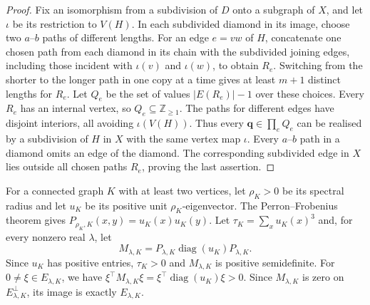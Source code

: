 \documentclass[10pt,a4paper]{article}
\theoremstyle{plain}
\theoremstyle{definition}
\DeclareMathOperator{\diag}{diag}
\newcommand{\Z}{\mathbb{Z}}
\begin{document}
\begin{proof}
Fix an isomorphism from a subdivision of $D$ onto a subgraph of $X$,
and let $\iota$ be its restriction to $V(H)$.
In each subdivided diamond in its image, choose two $a$--$b$ paths of
different lengths. For an edge $e=vw$ of $H$, concatenate one chosen
path from each diamond in its chain with the subdivided joining edges,
including those incident with $\iota(v)$ and $\iota(w)$, to obtain $R_e$.
Switching from the shorter to the longer path in one copy at a time
gives at least $m+1$ distinct lengths for $R_e$.
Let $Q_e$ be the set of values $|E(R_e)|-1$ over these choices.
Every $R_e$ has an internal vertex, so $Q_e\subseteq\Z_{\geq1}$.
The paths for different edges have disjoint interiors, all avoiding
$\iota(V(H))$. Thus every $\mathbf q\in\prod_eQ_e$ can be realised by
a subdivision of $H$ in $X$ with the same vertex map $\iota$.
Every $a$--$b$ path in a diamond omits an edge of the diamond.
The corresponding subdivided edge in $X$ lies outside all chosen
paths $R_e$, proving the last assertion.
\end{proof}

For a connected graph $K$ with at least two vertices, let $\rho_K>0$ be its spectral
radius and let $u_K$ be its positive unit $\rho_K$-eigenvector.
The Perron--Frobenius theorem gives
$P_{\rho_K,K}(x,y)=u_K(x)u_K(y)$.
Let $\tau_K=\sum_xu_K(x)^3$ and, for every nonzero real $\lambda$, let
\begin{equation}\label{eq:perron-data}
 M_{\lambda,K}=P_{\lambda,K}\diag(u_K)P_{\lambda,K}.
\end{equation}
Since $u_K$ has positive entries, $\tau_K>0$ and $M_{\lambda,K}$ is
positive semidefinite. For $0\ne\xi\in E_{\lambda,K}$, we have
$\xi^\top M_{\lambda,K}\xi=\xi^\top\diag(u_K)\xi>0$.
Since $M_{\lambda,K}$ is zero on $E_{\lambda,K}^{\perp}$, its image
is exactly $E_{\lambda,K}$.
\end{document}
